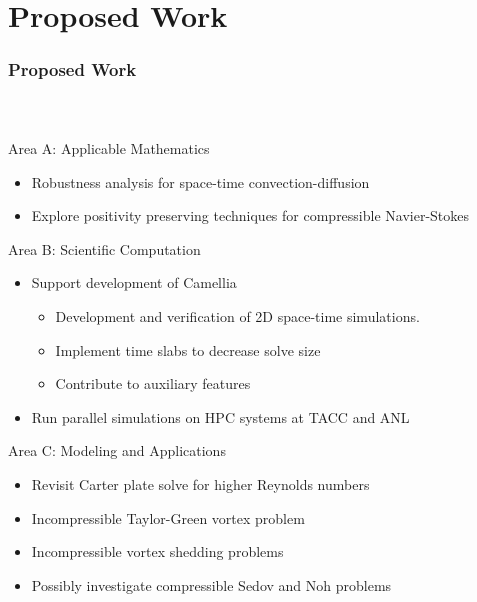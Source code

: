 \documentclass[18pt,xcolor=table]{beamer}
\begin{document}
\section{Proposed Work}
\begin{frame}[t]
\frametitle{Proposed Work}
\framesubtitle{~~}  %
Area A: Applicable Mathematics
\begin{itemize}
  \item Robustness analysis for space-time convection-diffusion
  \item Explore positivity preserving techniques for compressible Navier-Stokes
\end{itemize}
\bigskip

Area B: Scientific Computation
\begin{itemize}
  \item Support development of Camellia\cite{CamelliaDPG}
  \begin{itemize}
    \item Development and verification of 2D space-time simulations.
    \item Implement time slabs to decrease solve size
    \item Contribute to auxiliary features
  \end{itemize}
  \item Run parallel simulations on HPC systems at TACC and ANL
\end{itemize}
\bigskip

Area C: Modeling and Applications
\begin{itemize}
  \item Revisit Carter plate solve for higher Reynolds numbers
  \item Incompressible Taylor-Green vortex problem
  \item Incompressible vortex shedding problems
  \item Possibly investigate compressible Sedov and Noh problems
\end{itemize}
\end{frame}


\end{document}

